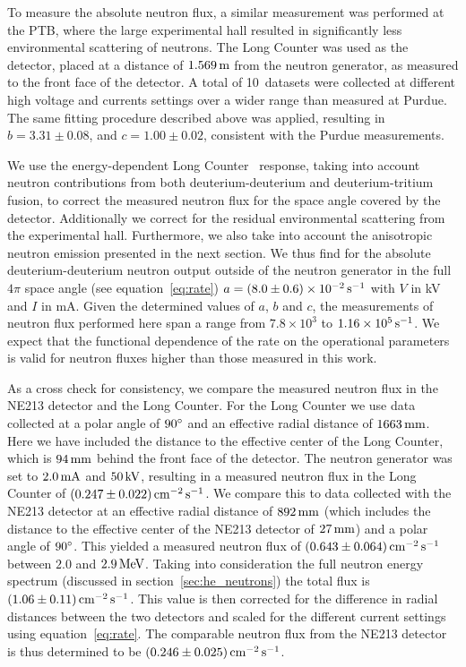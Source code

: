 To measure the absolute neutron flux, a similar measurement was performed at the PTB, where the large experimental hall resulted in significantly less environmental scattering of neutrons. The Long Counter was used as the detector, placed at a distance of $1.569\,\mathrm{m}$ from the neutron generator, as measured to the front face of the detector. A total of 10~datasets were collected at different high voltage and currents settings over a wider range than measured at Purdue. The same fitting procedure described above was applied, resulting in $b = 3.31 \pm 0.08$, and $c = 1.00 \pm 0.02$, consistent with the Purdue measurements.

We use the energy-dependent Long Counter~\cite{Roberts:2004} response, taking into account neutron contributions from both deuterium-deuterium and deuterium-tritium fusion, to correct the measured neutron flux for the space angle covered by the detector. Additionally we correct for the residual environmental scattering from the experimental hall. Furthermore, we also take into account the anisotropic neutron emission presented in the next section. We thus find for the absolute deuterium-deuterium neutron output outside of the neutron generator in the full $4\pi$ space angle (see equation~\eqref{eq:rate}) $a = (8.0 \pm 0.6)\times10^{-2}\,\mathrm{s^{-1}}$ with $V$ in kV and $I$ in mA. Given the determined values of $a$, $b$ and $c$, the measurements of neutron flux performed here span a range from $7.8\times 10^3$ to $1.16\times 10^5\,\mathrm{s^{-1}}$. We expect that the functional dependence of the rate on the operational parameters is valid for neutron fluxes higher than those measured in this work.

As a cross check for consistency, we compare the measured neutron flux in the NE213 detector and the Long Counter. For the Long Counter we use data collected at a polar angle of $90{}^{\circ}$ and an effective radial distance of $1663\,\mathrm{mm}$. Here we have included the distance to the effective center of the Long Counter, which is $94\,\mathrm{mm}$ behind the front face of the detector. The neutron generator was set to $2.0\,\mathrm{mA}$ and $50\,\mathrm{kV}$, resulting in a measured neutron flux in the Long Counter of $(0.247 \pm 0.022)\,\mathrm{cm^{-2}\,s^{-1}}$. We compare this to data collected with the NE213 detector at an effective radial distance of $892\,\mathrm{mm}$ (which includes the distance to the effective center of the NE213 detector of $27\,\mathrm{mm}$) and a polar angle of $90{}^{\circ}$. This yielded a measured neutron flux of $(0.643 \pm 0.064)\,\mathrm{cm^{-2}\,s^{-1}}$ between $2.0$ and $2.9\,\mathrm{MeV}$. Taking into consideration the full neutron energy spectrum (discussed in section~\ref{sec:he_neutrons}) the total flux is $(1.06 \pm 0.11)\,\mathrm{cm^{-2}\,s^{-1}}$. This value is then corrected for the difference in radial distances between the two detectors and scaled for the different current settings using equation~\eqref{eq:rate}. The comparable neutron flux from the NE213 detector is thus determined to be $(0.246 \pm 0.025)\,\mathrm{cm^{-2}\,s^{-1}}$.

